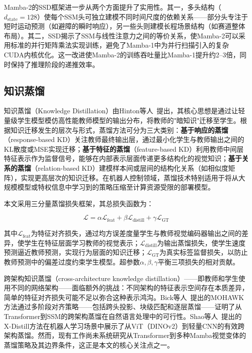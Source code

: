 \documentclass[12pt,a4paper]{article}
\numberwithin{equation}{section}
\numberwithin{figure}{section}
\numberwithin{table}{section}
\begin{document}
Mamba-2的SSD框架进一步从两个方面提升了实用性。其一，多头结构（$d_{\text{state}}=128$）使每个SSM头可独立建模不同时间尺度的依赖关系——部分头专注于短时运动预测（如避障的瞬时响应），另一些头则建模长程场景结构（如赛道整体布局）。其二，SSD揭示了SSM与线性注意力之间的等价关系，使Mamba-2可以采用标准的并行矩阵乘法实现训练，避免了Mamba-1中为并行扫描引入的复杂CUDA内核优化。这一改进使Mamba-2的训练吞吐量比Mamba-1提升约2--3倍，同时保持了推理阶段的递推效率。

\subsection{知识蒸馏}

知识蒸馏（Knowledge Distillation）由Hinton等人~\cite{hinton2015distilling}提出，其核心思想是通过让轻量级学生模型模仿高性能教师模型的输出分布，将教师的"暗知识"迁移至学生。根据知识迁移发生的层次与形式，蒸馏方法可分为三大类别：\textbf{基于响应的蒸馏}（response-based KD）关注教师最终输出层，通过最小化学生与教师输出之间的KL散度或MSE实现迁移；\textbf{基于特征的蒸馏}（feature-based KD）利用教师中间层特征表示作为监督信号，能够在内部表示层面传递更多结构化的视觉知识；\textbf{基于关系的蒸馏}（relation-based KD）建模样本间或层间的结构化关系（如相似度矩阵），实现更高层次的知识迁移。在机器人控制领域，蒸馏技术特别适用于将从大规模模型或特权信息中学习到的策略压缩至计算资源受限的部署模型。

本文采用三分量蒸馏损失框架，其总损失函数为：

\begin{equation}
\mathcal{L} = \alpha \mathcal{L}_{\text{feat}} + \beta \mathcal{L}_{\text{distill}} + \gamma \mathcal{L}_{\text{GT}}
\label{eq:total_distill}
\end{equation}

其中$\mathcal{L}_{\text{feat}}$为特征对齐损失，通过均方误差度量学生与教师视觉编码器输出之间的差异，使学生在特征层面学习教师的视觉表示；$\mathcal{L}_{\text{distill}}$为输出蒸馏损失，使学生速度预测逼近教师预测，实现行为层面的知识迁移；$\mathcal{L}_{\text{GT}}$为真实标签监督损失，以防止教师预测中的偏差过度约束学生模型。超参数$\alpha, \beta, \gamma$平衡三项损失的相对贡献。

跨架构知识蒸馏（cross-architecture knowledge distillation）——即教师和学生使用不同的网络架构——面临额外的挑战：不同架构的特征表示空间存在本质差异，简单的特征对齐损失可能不足以弥合这种表示鸿沟。Bick等人~\cite{bick2024mohawk}提出的MOHAWK方法通过多阶段对齐策略——包括跨头投影、块级匹配和逐层蒸馏——证明了从Transformer到SSM的跨架构蒸馏在自然语言处理中的可行性。Shao等人~\cite{shao2025xdistill}提出的X-Distill方法在机器人学习场景中展示了从ViT（DINOv2）到轻量CNN的有效跨架构蒸馏。然而，现有工作尚未系统研究从Transformer到多种Mamba视觉变体的蒸馏策略及其边界条件，这正是本文的核心关注点之一。
\end{document}
